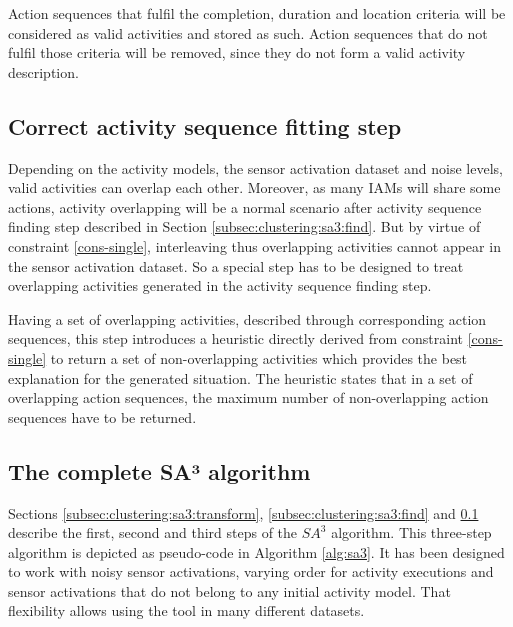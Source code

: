 Action sequences that fulfil the completion, duration and location criteria will be considered as valid activities and stored as such. Action sequences that do not fulfil those criteria will be removed, since they do not form a valid activity description.  

\subsection{Correct activity sequence fitting step}
\label{subsec:clustering:sa3:fit}
Depending on the activity models, the sensor activation dataset and noise levels, valid activities can overlap each other. Moreover, as many IAMs will share some actions, activity overlapping will be a normal scenario after activity sequence finding step described in Section \ref{subsec:clustering:sa3:find}. But by virtue of constraint \ref{cons-single}, interleaving thus overlapping activities cannot appear in the sensor activation dataset. So a special step has to be designed to treat overlapping activities generated in the activity sequence finding step. 

Having a set of overlapping activities, described through corresponding action sequences, this step introduces a heuristic directly derived from constraint \ref{cons-single} to return a set of non-overlapping activities which provides the best explanation for the generated situation. The heuristic states that in a set of overlapping action sequences, the maximum number of non-overlapping action sequences have to be returned. 
 

\subsection{The complete SA³ algorithm}
\label{subsec:clustering:sa3:complete}

Sections \ref{subsec:clustering:sa3:transform}, \ref{subsec:clustering:sa3:find} and \ref{subsec:clustering:sa3:fit} describe the first, second and third steps of the $SA^3$ algorithm. This three-step algorithm is depicted as pseudo-code in Algorithm \ref{alg:sa3}. It has been designed to work with noisy sensor activations, varying order for activity executions and sensor activations that do not belong to any initial activity model. That flexibility allows using the tool in many different datasets. 

